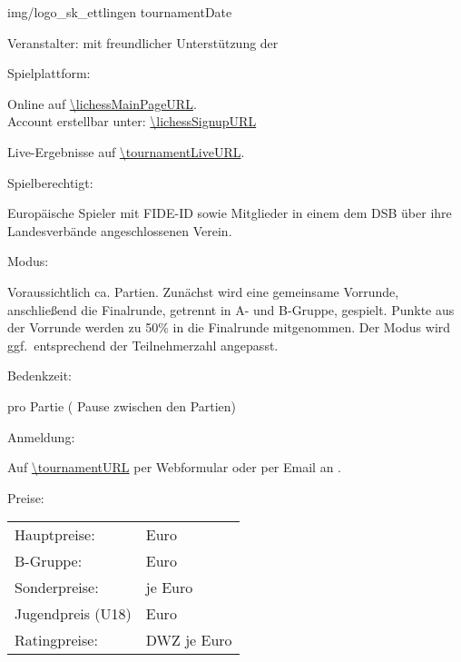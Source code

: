 \documentclass[paper=a4, fontsize=10pt]{scrartcl}
\begin{document}
                 {img/logo_sk_ettlingen}
                 {\tournamentName}
                 {tournamentDate}


\begin{basedescript}{\desclabelstyle{\multilinelabel}\desclabelwidth{10em}}


\item[Veranstalter:]
  \organizerName{} mit freundlicher Unterstützung der \sponsorName{}

\item[Spielplattform:]

  Online auf \url{\lichessMainPageURL}. \\
  Account erstellbar unter: \url{\lichessSignupURL}

  Live-Ergebnisse auf \url{\tournamentLiveURL}.

\item[Spielberechtigt:]

  Europäische Spieler mit FIDE-ID sowie Mitglieder in einem dem DSB
  über ihre Landesverbände angeschlossenen Verein.

\item[Modus:]

  Voraussichtlich ca. \expectedTotalGames{} Partien. Zunächst wird
  eine gemeinsame Vorrunde, anschließend die Finalrunde, getrennt in
  A- und B-Gruppe, gespielt. Punkte aus der Vorrunde werden zu 50\% in
  die Finalrunde mitgenommen. Der Modus wird ggf.\ entsprechend der
  Teilnehmerzahl angepasst.

\item[Bedenkzeit:]

  \timePerGame{} pro Partie (\pauseBetweenGames{} Pause zwischen den
  Partien)

\item[Anmeldung:]

  Auf \url{\tournamentURL} per Webformular oder per Email an
  \email{\tournamentEmail}.

\item[Preise:]

  \hspace{2em}\begin{tabular}[t]{ll}
    Hauptpreise:       &  \is{/}{\prizesTournamentA} Euro \\
    B-Gruppe:          &  \is{/}{\prizesTournamentB} Euro \\
    Sonderpreise:      &  \is{/}{\specialPrizesCateries} je \specialPrizes{} Euro \\
    Jugendpreis (U18)  &  \is{/}{\youthPrizes} Euro \\
    Ratingpreise:      &  DWZ \is{/}{\ratingPriceCategories} je \ratingPrices{} Euro
  \end{tabular}


\end{basedescript}
\end{document}
